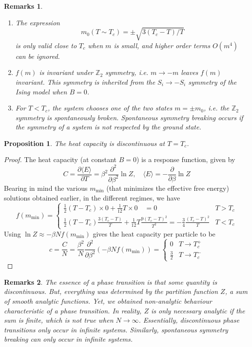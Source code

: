 \documentclass[a4paper]{article}
\newtheorem{remarks}{Remarks}[section]
\theoremstyle{new}
\newtheorem{prop}{Proposition}[section]
\begin{document}
\newpage
\begin{remarks}\leavevmode
\begin{enumerate}
    \item The expression 
$$m_0(T\sim T_c)=\pm\sqrt{3(T_c-T)/T}$$
is only valid close to $T_c$ when $m$ is small, and higher order terms $O(m^4)$ can be ignored.
    \item $f(m)$ is invariant under $\mathbb{Z}_2$ symmetry, i.e. $m\rightarrow -m$ leaves $f(m)$ invariant. This symmetry is inherited from the $S_i\rightarrow-S_i$ symmetry of the Ising model when $B=0$.
    \item For $T<T_c$, the system chooses one of the two states $m=\pm m_0$, i.e. the $\mathbb{Z}_2$ symmetry is spontaneously broken. Spontaneous symmetry breaking occurs if the symmetry of a system is not respected by the ground state.
\end{enumerate}
\end{remarks}
\begin{prop}
The heat capacity is discontinuous at $T=T_c$.
\end{prop}
\begin{proof}
The heat capacity (at constant $B=0$) is a response function, given by
$$C=\frac{\partial\langle E\rangle}{\partial T}=\beta^2\frac{\partial^2}{\partial\beta^2}\ln Z,\quad\langle E\rangle=-\frac{\partial}{\partial\beta}\ln Z$$
Bearing in mind the various $m_{\text{min}}$ (that minimizes the effective free energy) solutions obtained earlier, in the different regimes, we have 
$$f(m_{\text{min}})=
\left\{
        \begin{array}{ll}
      \frac{1}{2}(T-T_c)\times 0+\frac{1}{12}T\times 0\quad=0 & T>T_c \\
      \frac{1}{2}(T-T_c)\frac{3(T_c-T)}{T}+\frac{1}{12}T\frac{9(T_c-T)^2}{T^2}=-\frac{3}{4}\frac{(T_c-T)^2}{T} & T<T_c
      \end{array}
    \right.$$
Using $\ln Z\approx-\beta N f(m_{\text{min}})$ gives the heat capacity per particle to be
$$c=\frac{C}{N}=\frac{\beta^2}{N}\frac{\partial^2}{\partial\beta^2}(-\beta N f(m_{\text{min}}))=
\left\{
        \begin{array}{ll}
      0 & T\rightarrow T_c^+ \\
      \frac{3}{2} & T\rightarrow T_c^-
        \end{array}
    \right.$$
\end{proof}
\begin{remarks}
The essence of a phase transition is that some quantity is discontinuous. But, everything was determined by the partition function $Z$, a sum of smooth analytic functions. Yet, we obtained non-analytic behaviour characteristic of a phase transition. In reality, $Z$ is only necessary analytic if the sum is finite, which is not true when $N\rightarrow\infty$. Essentially, discontinuous phase transitions only occur in infinite systems.  Similarly, spontaneous symmetry breaking can only occur in infinite systems.
\end{remarks}
\end{document}
